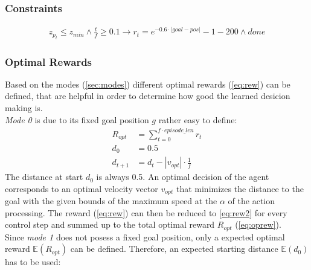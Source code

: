 \subsubsection{Constraints}
\begin{align}
	z_{p_t} \leq z_{min} \land \frac{t}{f} \geq 0.1 \to r_t = e^{-0.6 \cdot |goal - pos|} - 1 -200 \land done
\end{align}

\newpage

\subsubsection{Optimal Rewards}
Based on the modes (\cref{sec:modes}) different optimal rewards (\cref{eq:rew}) can be defined, that are helpful in order to determine how good the learned desicion making is.\\
\newline
\emph{Mode 0} is due to its fixed goal position $g$ rather easy to define:
\begin{align}
R_{opt} &= \sum_{t=0}^{f \cdot episode\_len} r_t \label{eq:oprew}\\
d_0 &= 0.5\\
d_{t+1} &= d_t - |v_{opt}| \cdot \frac{1}{f} \label{eq:dt1}%
\end{align}
The distance at start $d_0$ is always 0.5. An optimal decision of the agent corresponds to an optimal velocity vector $v_{opt}$ that minimizes the distance to the goal with the given bounds of the maximum speed at the $\alpha$ of the action processing. The reward (\cref{eq:rew}) can then be reduced to \cref{eq:rew2} for every control step and summed up to the total optimal reward $R_{opt}$ (\cref{eq:oprew}).\\
\newline
Since \emph{mode 1} does not posess a fixed goal position, only a expected optimal reward $\mathbb{E}(R_{opt})$ can be defined. Therefore, an expected starting distance $\mathbb{E}(d_0)$ has to be used:
